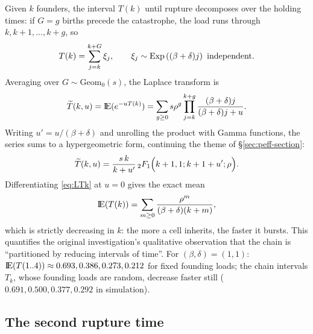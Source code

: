 Given $k$ founders, the interval $T(k)$ until rupture decomposes over the
holding times: if $G=g$ births precede the catastrophe, the load runs
through $k,k+1,\ldots,k+g$, so
\begin{equation}
T(k)=\sum_{j=k}^{k+G}\xi_j,
\qquad
\xi_j\sim\mathrm{Exp}\left((\beta+\delta)j\right)\ \text{independent}.
\end{equation}
Averaging over $G\sim\mathrm{Geom}_0(s)$, the Laplace transform is
\begin{equation}
\widetilde{T}(k,u)={\rm I}\!{\rm E}(e^{-uT(k)})
=\sum_{g\ge0}s\rho^g\prod_{j=k}^{k+g}\frac{(\beta+\delta)j}{(\beta+\delta)j+u}.
\label{eq:LTk}
\end{equation}
Writing $u'=u/(\beta+\delta)$ and unrolling the product with Gamma
functions, the series sums to a hypergeometric form, continuing the theme of
\S\ref{sec:peff-section}:
\begin{equation}
\widetilde{T}(k,u)=\frac{s\,k}{k+u'}\,{}_2F_1\Bigl(k+1,1;k+1+u';\rho\Bigr).
\label{eq:LTk-hyp}
\end{equation}
Differentiating \eqref{eq:LTk} at $u=0$ gives the exact mean
\begin{equation}
{\rm I}\!{\rm E}(T(k))=\sum_{m\ge0}\frac{\rho^m}{(\beta+\delta)(k+m)},
\label{eq:meanT}
\end{equation}
which is strictly decreasing in $k$: the more a cell inherits, the faster it
bursts. This quantifies the original investigation's qualitative
observation that the chain is ``partitioned by reducing intervals of time''.
For $(\beta,\delta)=(1,1)$: ${\rm I}\!{\rm E}(T(1..4))\approx0.693,0.386,0.273,0.212$
for fixed founding loads; the chain intervals $T_k$, whose founding loads
are random, decrease faster still
($0.691,0.500,0.377,0.292$ in simulation).

\subsection{The second rupture time}

